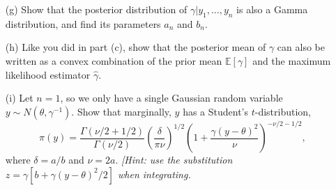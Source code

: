 \documentclass{article}
\begin{document}
\begin{enumerate}
    \item[(g)] Show that the posterior distribution of $\gamma | y_1, \dots, y_n$ is also a Gamma distribution, and find its parameters $a_n$ and $b_n$.
    
    \item[(h)] Like you did in part (c), show that the posterior mean of $\gamma$ can also be written as a convex combination of the prior mean $\mathbb{E}[\gamma]$ and the maximum likelihood estimator $\hat{\gamma}$.
    
    \item[(i)] Let $n = 1$, so we only have a single Gaussian random variable $y \sim N(\theta, \gamma^{-1})$. Show that marginally, $y$ has a Student's $t$-distribution,
    \[
    \pi(y) = \frac{\Gamma(\nu/2 + 1/2)}{\Gamma(\nu/2)} \left( \frac{\delta}{\pi \nu} \right)^{1/2} \left( 1 + \frac{\gamma (y - \theta)^2}{\nu} \right)^{-\nu/2-1/2},
    \]
    where $\delta = a/b$ and $\nu = 2a$. \textit{[Hint: use the substitution $z = \gamma[b + \gamma(y - \theta)^2/2]$ when integrating.}
\end{enumerate}
\end{document}
